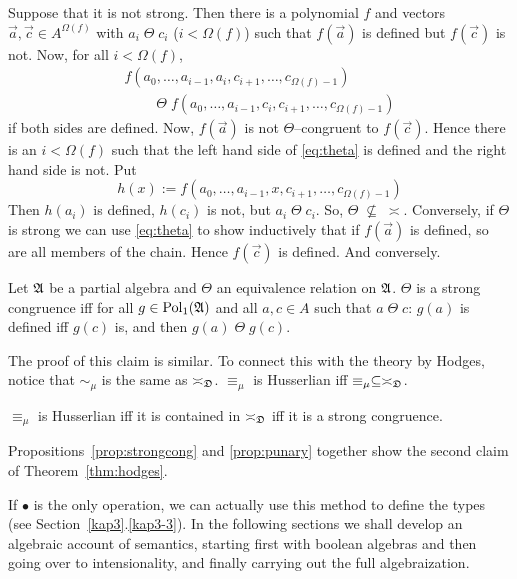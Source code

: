 Suppose that it is not strong. Then there is a polynomial $f$ and
vectors $\vec{a}, \vec{c} \in A^{\Omega(f)}$ with $a_i\; \Theta\;
c_i$ ($i < \Omega(f)$) such that $f(\vec{a})$ is defined but
$f(\vec{c})$ is not. Now, for all $i < \Omega(f)$,
\begin{multline}
\label{eq:theta}
f(a_0, \dotsc, a_{i-1}, a_i, c_{i+1}, \dotsc, c_{\Omega(f)-1})
\\ \qquad
\; \Theta\; f(a_0, \dotsc, a_{i-1}, c_i, c_{i+1}, \dotsc,
c_{\Omega(f)-1})
\end{multline}
if both sides are defined. Now, $f(\vec{a})$ is not
$\Theta$--congruent to $f(\vec{c})$. Hence there is an $i <
\Omega(f)$ such that the left hand side of \eqref{eq:theta} 
is defined and the right hand side is not. Put 
\begin{equation}
h(x) := f(a_0, \dotsc, a_{i-1}, x, c_{i+1}, \dotsc, 
c_{\Omega(f)-1})
\end{equation}
Then $h(a_i)$ is defined, $h(c_i)$ is not, but $a_i\; \Theta \; c_i$. 
So, $\Theta\; \nsubseteq\; \asymp$. Conversely, if $\Theta$ is strong 
we can use \eqref{eq:theta} to show inductively that if $f(\vec{a})$ is 
defined, so are all members of the chain. Hence $f(\vec{c})$ is defined. 
And conversely.
\proofend
\begin{prop}
\label{prop:punary}%
Let $\mathfrak{A}$ be a partial algebra and $\Theta$ an
equivalence relation on $\mathfrak{A}$. $\Theta$ is a strong congruence 
iff for all $g \in \operatorname{Pol}_1(\mathfrak{A})$ and all $a, c
\in A$ such that $a\; \Theta\; c$: $g(a)$ is defined iff
$g(c)$ is, and then $g(a)\; \Theta\; g(c)$.
\end{prop}
The proof of this claim is similar. To connect this with the
theory by Hodges, notice that $\sim_{\mu}$ is the same as
$\asymp_{\mathfrak{D}}$. $\equiv_{\mu}$ is Husserlian iff
$\equiv_{\mu} \subseteq \asymp_{\mathfrak{D}}$.
\begin{prop}
$\equiv_{\mu}$ is Husserlian iff it is contained in
$\asymp_{\mathfrak{D}}$ iff it is a strong congruence.
\end{prop}
Propositions~\ref{prop:strongcong} and \ref{prop:punary} together
show the second claim of Theorem~\ref{thm:hodges}.

If $\bullet$ is the only operation, we can actually use this
method to define the types (see Section~\ref{kap3}.\ref{kap3-3}). In
the following sections we shall develop an algebraic account
of semantics, starting first with boolean algebras and then
going over to intensionality, and finally carrying out the
full algebraization.

